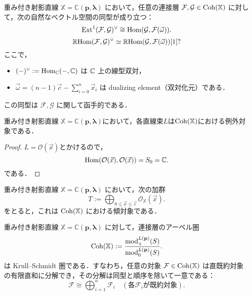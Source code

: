\begin{thm}\cite{GL87}
重み付き射影直線 $\mathbb{X} = \mathbb{C}(\mathbf{p}, \boldsymbol{\lambda})$ において，任意の連接層 $\mathcal{F}, \mathcal{G} \in \operatorname{\mathrm{Coh}}(\mathbb{X})$ に対して，次の自然なベクトル空間の同型が成り立つ：
\[
\operatorname{\mathrm{Ext}}^1(\mathcal{F}, \mathcal{G})^\vee \cong \operatorname{\mathrm{Hom}}(\mathcal{G}, \mathcal{F}(\vec{\omega})).
\]
\[
\operatorname{\mathbb{R}\mathrm{Hom}}({\mathcal F},{\mathcal G})^\vee \simeq \operatorname{\mathbb{R}\mathrm{Hom}}({\mathcal G},{\mathcal F}(\vec{\omega}))[1]?\]
ここで，
\begin{itemize}
	\item $(-)^\vee := \operatorname{\mathrm{Hom}}_{{\mathbb C}}(-, {\mathbb C})$ は ${\mathbb C}$ 上の線型双対，
  \item $\vec{\omega} = (n - 1)\vec{c} - \sum_{i=0}^n \vec{x}_i$ は dualizing element（双対化元）である．
\end{itemize}
この同型は $\mathcal{F}, \mathcal{G}$ に関して函手的である．
\end{thm}

\begin{lemm}
	重み付き射影直線 $\mathbb{X} = \mathbb{C}(\mathbf{p}, \boldsymbol{\lambda})$において，各直線束$L$は$\operatorname{\mathrm{Coh}}({\mathbb X})$における例外対象である．
\end{lemm}
\begin{proof}
	$L = \mathcal{O}(\vec{x})$とかけるので，
	\[\operatorname{\mathrm{Hom}}(\mathcal{O}(\vec{x}),\mathcal{O}(\vec{x}))=S_0={\mathbb C}.\]
	である．
\end{proof}

\begin{thm}\cite{GL87}
重み付き射影直線 $\mathbb{X} = \mathbb{C}(\mathbf{p}, \boldsymbol{\lambda})$ において，次の加群
\[
T := \bigoplus_{0 \le \vec{x} \le \vec{c}} \mathcal{O}_{\mathbb{X}}(\vec{x}).
\]
をとると，これは $\operatorname{\mathrm{Coh}}(\mathbb{X})$ における傾対象である．
\end{thm}


\begin{thm}\cite{GL87}
重み付き射影直線 $\mathbb{X} = \mathbb{C}(\mathbf{p}, \boldsymbol{\lambda})$ に対して，連接層のアーベル圏
\[
\operatorname{\mathrm{Coh}}(\mathbb{X}) := \frac{\mathrm{mod}_+^{L(\mathbf{p})}(S)}{\mathrm{mod}_0^{L(\mathbf{p})}(S)}.
\]
は Krull--Schmidt 圏である．すなわち，任意の対象 $\mathcal{F} \in \operatorname{\mathrm{Coh}}(\mathbb{X})$ は直既約対象の有限直和に分解でき，その分解は同型と順序を除いて一意である：
\[
\mathcal{F} \cong \bigoplus_{i=1}^n \mathcal{F}_i \quad (\text{各} \mathcal{F}_i \text{が既約対象}).
\]
\end{thm}


